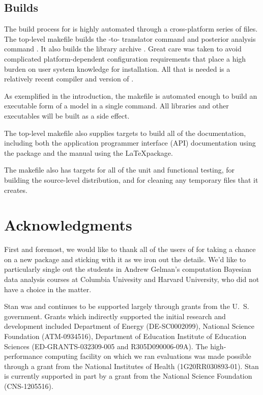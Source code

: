 \documentclass[article]{jss}
\begin{document}
\subsection{Builds}

The build process for  is highly automated through a
cross-platform series of  files.  The top-level makefile
builds the -to- translator command
 and posterior analysis command .  It
also builds the library archive .  Great care was
taken to avoid complicated platform-dependent configuration
requirements that place a high burden on user system knowledge for
installation.  All that is needed is a relatively recent
 compiler and version of .

As exemplified in the introduction, the makefile is automated enough
to build an executable form of a  model in a single
command.  All libraries and other executables will be built as a side
effect.  

The top-level makefile also supplies targets to build all of the
documentation, including both the  application
programmer interface (API) documentation using the 
package and the manual using the \LaTeX package.

The makefile also has targets for all of the unit and functional
testing, for building the source-level distribution, and for cleaning
any temporary files that it creates.

\section*{Acknowledgments}

First and foremost, we would like to thank all of the users of
 for taking a chance on a new package and sticking with
it as we iron out the details.  We'd like to particularly single out
the students in Andrew Gelman's computation Bayesian data analysis
courses at Columbia Univesity and Harvard University, who did not have
a choice in the matter.

Stan was and continues to be supported largely through grants from the
U.~S. government.  Grants which indirectly supported the initial
research and development included Department of Energy (DE-SC0002099),
National Science Foundation (ATM-0934516), Department of Education
Institute of Education Sciences (ED-GRANTS-032309-005 and
R305D090006-09A).  The high-performance computing facility on which we
ran evaluations was made possible through a grant from the National
Institutes of Health (1G20RR030893-01).  Stan is currently supported
in part by a grant from the National Science Foundation (CNS-1205516).
\end{document}
